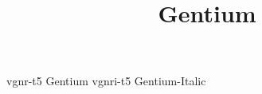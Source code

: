 \documentclass[test]{vnsample}
\title{Gentium}
\begin{document}
\begin{shortsample}
   {vgnr-t5}  {Gentium}
  {vgnri-t5} {Gentium-Italic}
\end{shortsample}
\end{document}
